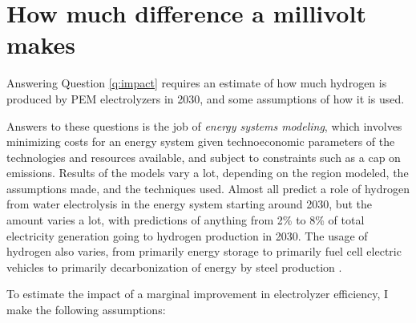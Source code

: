 
\section{How much difference a millivolt makes}

Answering Question \ref{q:impact} requires an estimate of how much hydrogen is produced by PEM electrolyzers in 2030, and some assumptions of how it is used.

Answers to these questions is the job of \textit{energy systems modeling}, which involves minimizing costs for an energy system given technoeconomic parameters of the technologies and resources available, and subject to constraints such as a cap on  emissions\cite{Storgaard2019_MSc}. Results of the models vary a lot, depending on the region modeled, the assumptions made, and the techniques used. Almost all predict a role of hydrogen from water electrolysis in the energy system starting around 2030, but the amount varies a lot, with predictions of anything from 2\% to 8\% of total electricity generation going to hydrogen production in 2030. The usage of hydrogen also varies, from primarily energy storage\cite{Budischak2013, Storgaard2019_MSc, Jacobson2018} to primarily fuel cell electric vehicles\cite{Meibom2010} to primarily decarbonization of energy by steel production \cite{Sgobbi2016}. 

To estimate the impact of a marginal improvement in electrolyzer efficiency, I make the following assumptions:

